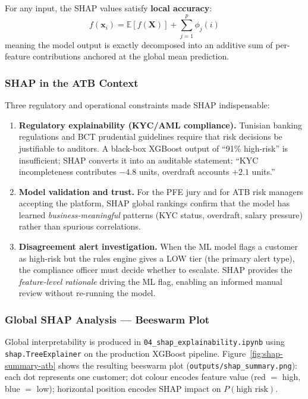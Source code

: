 For any input, the SHAP values satisfy \textbf{local accuracy}:
\begin{equation}
f(\mathbf{x}_i) = \mathbb{E}[f(\mathbf{X})] + \sum_{j=1}^{p} \phi_j(i)
\label{eq:shap-local-accuracy}
\end{equation}
meaning the model output is exactly decomposed into an additive sum of per-feature
contributions anchored at the global mean prediction.

\subsubsection{SHAP in the ATB Context}

Three regulatory and operational constraints made SHAP indispensable:

\begin{enumerate}
    \item \textbf{Regulatory explainability (KYC/AML compliance).} Tunisian banking
          regulations and BCT prudential guidelines require that risk decisions be
          justifiable to auditors. A black-box XGBoost output of ``91\% high-risk''
          is insufficient; SHAP converts it into an auditable statement: ``KYC
          incompleteness contributes $-4.8$ units, overdraft accounts $+2.1$ units.''
    \item \textbf{Model validation and trust.} For the PFE jury and for ATB risk
          managers accepting the platform, SHAP global rankings confirm that the
          model has learned \emph{business-meaningful} patterns (KYC status,
          overdraft, salary pressure) rather than spurious correlations.
    \item \textbf{Disagreement alert investigation.} When the ML model flags a
          customer as high-risk but the rules engine gives a LOW tier (the primary
          alert type), the compliance officer must decide whether to escalate.
          SHAP provides the \emph{feature-level rationale} driving the ML flag,
          enabling an informed manual review without re-running the model.
\end{enumerate}

\subsubsection{Global SHAP Analysis --- Beeswarm Plot}

Global interpretability is produced in \texttt{04\_shap\_explainability.ipynb}
using \texttt{shap.TreeExplainer} on the production XGBoost pipeline.
Figure~\ref{fig:shap-summary-atb} shows the resulting beeswarm plot
(\texttt{outputs/shap\_summary.png}): each dot represents one customer;
dot colour encodes feature value (red $=$ high, blue $=$ low); horizontal
position encodes SHAP impact on $P(\text{high risk})$.

